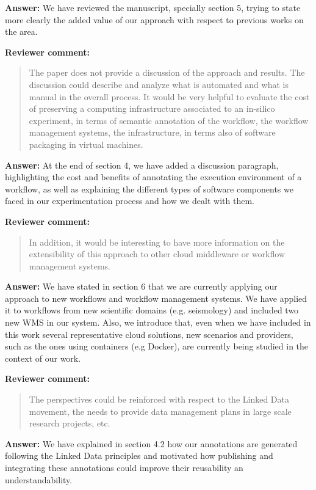 \documentclass{letter}
\newenvironment{review}%
{\textbf{Reviewer comment:}\begin{quote}}%
{\end{quote}}%
\newcommand{\todo}[1]{%
      \color{red}\textbf{[TODO]} #1\color{black}}
\newcommand{\answer}[1]{%
      \textbf{Answer:} #1}
\begin{document}
\begin{letter}{}
\answer{We have reviewed the  manuscript, specially section 5, trying to state more clearly the added value of our approach with respect to previous works on the area.}


\begin{review}
The paper does not provide a discussion of the approach and results. The discussion could describe and analyze what is automated and what is manual in the overall process. It would be very helpful to evaluate the cost of preserving a computing infrastructure associated to an in-silico experiment, in terms of semantic annotation of the workflow, the workflow management systems, the infrastructure, in terms also of software packaging in virtual machines.
\end{review}

\answer{At the end of section 4, we have added a discussion paragraph, highlighting the cost and benefits of annotating the execution environment of a workflow, as well as explaining the different types of software components we faced in our experimentation process and how we dealt with them.}

\begin{review}
In addition, it would be interesting to have more information on the extensibility of this approach to other cloud middleware or workflow management systems.
\end{review}

\answer{We have stated in section 6 that we are currently applying our approach to new workflows and workflow management systems. We have applied it to workflows from new scientific domains (e.g. seismology) and included two new WMS in our system.} Also, we introduce that, even when we have included in this work several representative cloud solutions, new scenarios and providers, such as the ones using containers (e.g Docker), are currently being studied in the context of our work.



\begin{review}
The perspectives could be reinforced with respect to the Linked Data movement, the needs to provide data management plans in large scale research projects, etc.
\end{review}

\answer{We have explained in section 4.2 how our annotations are generated following the Linked Data principles and motivated how publishing and integrating these annotations could improve their reusability an understandability.}



\end{letter}
\end{document}
